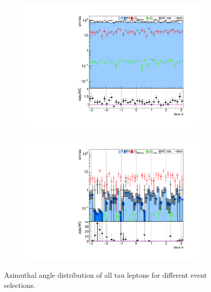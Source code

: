 \begin{figure}
\begin{subfigure}[t]{0.49\textwidth}
                \label{tauphi:2b2tau}
                \end{subfigure}
                \begin{subfigure}[t]{0.49\textwidth}
                \includegraphics[width=\textwidth]{figures/plots/kinLQ75/tau_phi_2j1b_1tau.pdf}
                \label{tauphi:1b1tau}
                \end{subfigure}
                \begin{subfigure}[t]{0.49\textwidth}
                \includegraphics[width=\textwidth]{figures/plots/kinLQ75/tau_phi_2j1b_2tau.pdf}
                \label{tauphi:1b2tau}
                \end{subfigure}
\caption[Azimuthal angle distribution of all tau leptons for different event selections.]{Azimuthal angle distribution of all tau leptons for different event selections.}
\label{tauphi}
\end{figure}
